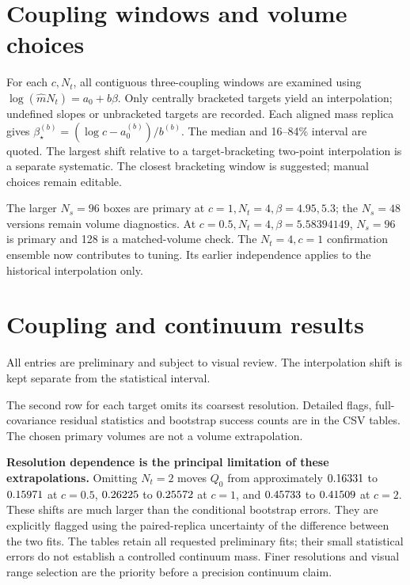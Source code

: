 \documentclass[11pt,a4paper]{article}
\begin{document}
\clearpage\section*{Coupling windows and volume choices}
For each $c,N_t$, all contiguous three-coupling windows are examined using
$\log(\widehat mN_t)=a_0+b\beta$. Only centrally bracketed targets yield
an interpolation; undefined slopes or unbracketed targets are recorded.
Each aligned mass replica gives $\beta_\star^{(b)}=(\log c-a_0^{(b)})/b^{(b)}$.
The median and 16--84\% interval are quoted. The largest shift relative to
a target-bracketing two-point interpolation is a separate systematic.
The closest bracketing window is suggested; manual choices remain editable.

The larger $N_s=96$ boxes are primary at $c=1,N_t=4,\beta=4.95,5.3$;
the $N_s=48$ versions remain volume diagnostics. At $c=0.5,N_t=4,
\beta=5.58394149$, $N_s=96$ is primary and 128 is a matched-volume check.
The $N_t=4,c=1$ confirmation ensemble now contributes to tuning. Its earlier
independence applies to the historical interpolation only.

\section*{Coupling and continuum results}
\begin{center}\small\end{center}
All entries are preliminary and subject to visual review. The interpolation
shift is kept separate from the statistical interval.
\begin{center}\small\end{center}
The second row for each target omits its coarsest resolution. Detailed flags,
full-covariance residual statistics and bootstrap success counts are in the
CSV tables. The chosen primary volumes are not a volume extrapolation.

\textbf{Resolution dependence is the principal limitation of these extrapolations.}
Omitting $N_t=2$ moves $Q_0$ from approximately $0.16331$ to $0.15971$
at $c=0.5$, $0.26225$ to $0.25572$ at $c=1$, and $0.45733$ to
$0.41509$ at $c=2$. These shifts are much larger than the conditional
bootstrap errors. They are explicitly flagged using the paired-replica
uncertainty of the difference between the two fits. The tables retain all
requested preliminary fits; their small statistical errors do not establish
a controlled continuum mass. Finer resolutions and visual range selection
are the priority before a precision continuum claim.
\end{document}
